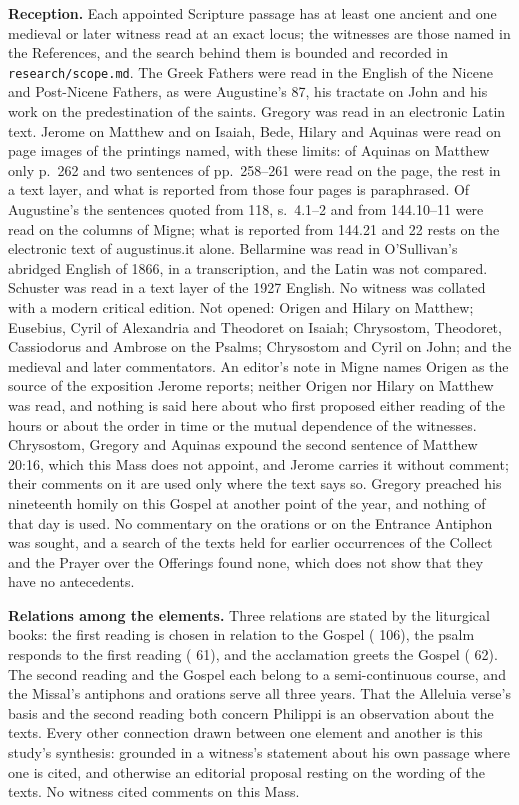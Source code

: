 {\textbf{Reception.} Each appointed Scripture passage has at least one ancient
and one medieval or later witness read at an exact locus; the witnesses are
those named in the References, and the search behind them is bounded and
recorded in \texttt{research/scope.md}. The Greek Fathers were read in
the English of the Nicene and Post-Nicene Fathers, as were Augustine's
 87, his tractate on John and his work on the predestination of the
saints. Gregory was read in an electronic Latin text. Jerome on Matthew and
on Isaiah, Bede, Hilary and Aquinas were read on page images of the printings
named, with these limits: of Aquinas on Matthew only p.~262 and two sentences
of pp.~258--261 were read on the page, the rest in a text layer, and what is
reported from those four pages is paraphrased. Of Augustine's  the sentences quoted from
118, s.~4.1--2 and from 144.10--11 were read on the columns of Migne; what is
reported from 144.21 and 22 rests on the electronic text of augustinus.it
alone. Bellarmine was read in O'Sullivan's abridged English of 1866, in a
transcription, and the Latin was not compared. Schuster was read in a text
layer of the 1927 English. No witness was collated with a modern critical
edition. Not opened: Origen and Hilary on Matthew; Eusebius, Cyril of
Alexandria and Theodoret on Isaiah; Chrysostom, Theodoret, Cassiodorus and
Ambrose on the Psalms; Chrysostom and Cyril on John; and the medieval and
later commentators. An editor's note in
Migne names Origen as the source of the exposition Jerome reports; neither
Origen nor Hilary on Matthew was read, and nothing is said here about who first
proposed either reading of the hours or about the order in time or the mutual
dependence of the witnesses. Chrysostom, Gregory and Aquinas expound the
second sentence of Matthew 20:16, which this Mass does not appoint, and Jerome
carries it without comment; their comments on it are used only where the text
says so. Gregory preached his
nineteenth homily on this Gospel at another point of the year, and nothing of
that day is used. No commentary on the orations or on the Entrance Antiphon
was sought, and a search of the texts held for earlier occurrences of the
Collect and the Prayer over the Offerings found none, which does not show that
they have no antecedents.

\textbf{Relations among the elements.} Three relations are stated by the
liturgical books: the first reading is chosen in relation to the Gospel
( 106), the psalm responds to the first reading
( 61), and the acclamation greets the Gospel
( 62). The second reading and the Gospel each belong
to a semi-continuous course, and the Missal's antiphons and orations serve all
three years. That the Alleluia verse's basis and the second reading both
concern Philippi is an observation about the texts. Every other connection drawn
between one element and another is this study's synthesis: grounded in a
witness's statement about his own passage where one is cited, and otherwise an
editorial proposal resting on the wording of the texts. No witness cited
comments on this Mass.

}
